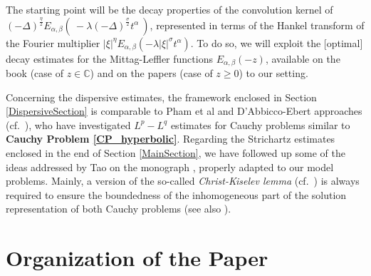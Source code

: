 \documentclass{amsart}
\theoremstyle{definition}
\theoremstyle{remark}
\numberwithin{equation}{section}
\begin{document}
The starting point will be the decay properties of the convolution kernel of $\displaystyle (-\Delta)^{\frac{\eta}{2}}E_{\alpha,\beta}\left(~-\lambda (-\Delta)^{\frac{\sigma}{2}}t^\alpha~\right)$, represented in terms of the Hankel transform of the Fourier multiplier $\displaystyle |\xi|^{\eta}E_{\alpha,\beta}\left(-\lambda |\xi|^{\sigma}t^\alpha\right)$. To do so, we will exploit the [optimal] decay estimates for the Mittag-Leffler functions $E_{\alpha,\beta}(-z)$, available on the book \cite{Podlubny99} (case of $z\in \mathbb{C}$) and on the papers \cite{Simon14,BS21} (case of $z\geq 0$) to our setting. 



Concerning the dispersive estimates, the framework enclosed in Section \ref{DispersiveSection} is comparable to Pham et al and D'Abbicco-Ebert approaches (cf.~\cite{PMR15,AE_21}), who have investigated $L^p-L^q$ estimates for Cauchy problems similar to {\bf Cauchy Problem \ref{CP_hyperbolic}}.
Regarding the Strichartz estimates enclosed in the end of Section \ref{MainSection}, we have followed up some of the ideas addressed by Tao on the monograph \cite{Tao06}, properly adapted to our model problems. Mainly, a version of the so-called {\it Christ-Kiselev lemma} (cf.~\cite[Lemma 2.4]{Tao06}) is always required to ensure the boundedness of the inhomogeneous part of the solution representation of both Cauchy problems (see also \cite[THEOREM 1.2.]{KTao98}).









\section{Organization of the Paper}
\end{document}
